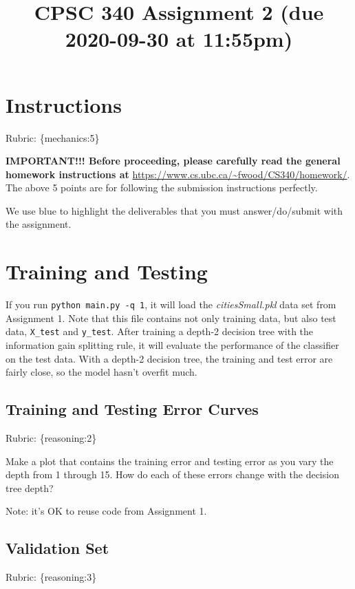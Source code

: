 \documentclass{article}
\def\rubric#1{\gre{Rubric: \{#1\}}}{}
\def\blu#1{{\color{blu}#1}}
\def\gre#1{{\color{gre}#1}}
\begin{document}
\title{CPSC 340 Assignment 2 (due 2020-09-30 at 11:55pm)}
\author{}
\date{}
\maketitle
\vspace{-4em}

\section*{Instructions}
\rubric{mechanics:5}

\textbf{IMPORTANT!!! Before proceeding, please carefully read the general homework instructions at} \url{https://www.cs.ubc.ca/~fwood/CS340/homework/}. The above 5 points are for following the submission instructions perfectly.

\vspace{1em}
We use \blu{blue} to highlight the deliverables that you must answer/do/submit with the assignment.

\section{Training and Testing}
If you run \texttt{python main.py \string-q 1}, it will load the \emph{citiesSmall.pkl} data set from Assignment 1.
Note that this file contains not only training data, but also test data, \texttt{X\string_test} and \texttt{y\string_test}.
After training a depth-2 decision tree with the information gain splitting rule, it will evaluate the performance of the classifier on the test data.
With a depth-2 decision tree, the training and test error are fairly close, so the model hasn't overfit much.

\subsection{Training and Testing Error Curves}
\rubric{reasoning:2}

\blu{Make a plot that contains the training error and testing error as you vary the depth from 1 through 15. How do each of these errors change with the decision tree depth?}

Note: it's OK to reuse code from Assignment 1.


\subsection{Validation Set}
\rubric{reasoning:3}
\end{document}
